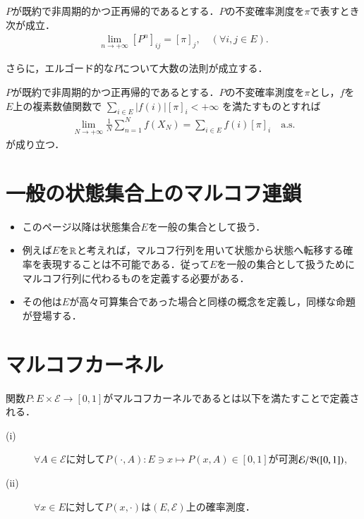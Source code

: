 	\begin{thm}[エルゴード性]
		$P$が既約で非周期的かつ正再帰的であるとする．$P$の不変確率測度を$\pi$で表すとき次が成立．
		\begin{align}
			\lim_{n \to +\infty}[P^n]_{ij} = [\pi]_j, \quad (\forall i,j \in E).
		\end{align}
	\end{thm}
	
	さらに，エルゴード的な$P$について大数の法則が成立する．
	\begin{prp}[大数の法則]
		$P$が既約で非周期的かつ正再帰的であるとする．$P$の不変確率測度を$\pi$とし，$f$を$E$上の複素数値関数で
		$\sum_{i \in E} |f(i)|[\pi]_i < +\infty$
		を満たすものとすれば
		\begin{align}
			\lim_{N \to +\infty} \frac{1}{N} \sum_{n=1}^{N} f(X_N) = \sum_{i \in E} f(i) [\pi]_i \quad \mathrm{a.s.}
		\end{align}
		が成り立つ．
	\end{prp}

\section{一般の状態集合上のマルコフ連鎖}
	\label{sec:generally}
	\begin{itemize}
		\item このページ以降は状態集合$E$を一般の集合として扱う．
		\item 例えば$E$を$\mathbb{R}$と考えれば，マルコフ行列を用いて状態から状態へ転移する確率を表現することは不可能である．従って$E$を一般の集合として扱うためにマルコフ行列に代わるものを定義する必要がある．
		\item その他は$E$が高々可算集合であった場合と同様の概念を定義し，同様な命題が登場する．
	\end{itemize}

\section{マルコフカーネル}
	\begin{dfn}
		関数$P:E \times \mathcal{E} \longrightarrow [0,1]$がマルコフカーネルであるとは以下を満たすことで定義される．
		\begin{description}
			\item[\rm{(i)}] $\forall A \in \mathcal{E}$に対して$P(\cdot,A):E \ni x \longmapsto P(x,A) \in [0,1]$が可測$\mathcal{E}/\mathfrak{B}([0,1])$,
			\item[\rm{(ii)}] $\forall x \in E$に対して$P(x,\cdot)$は$(E,\mathcal{E})$上の確率測度．
		\end{description}
	\end{dfn}
	
